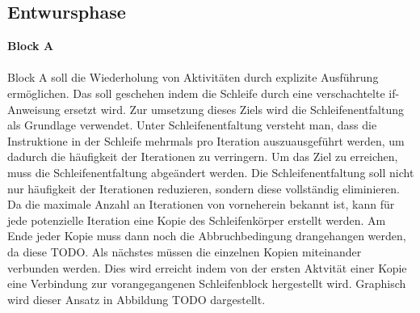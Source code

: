 \documentclass{article}
\begin{document}
    \subsection{Entwursphase}
    \textbf{Block A}\\
    \\
    Block A soll die Wiederholung von Aktivitäten durch explizite Ausführung ermöglichen.
    Das soll geschehen indem die Schleife durch eine verschachtelte if-Anweisung ersetzt wird.
    Zur umsetzung dieses Ziels wird die Schleifenentfaltung als Grundlage verwendet.
    Unter Schleifenentfaltung versteht man, dass die Instruktione in der Schleife mehrmals pro Iteration auszuausgeführt werden, um dadurch die häufigkeit der Iterationen zu verringern. \cite{9}
    Um das Ziel zu erreichen, muss die Schleifenentfaltung abgeändert werden.
    Die Schleifenentfaltung soll nicht nur häufigkeit der Iterationen reduzieren, sondern diese vollständig eliminieren.
    Da die maximale Anzahl an Iterationen von vorneherein bekannt ist, kann für jede potenzielle Iteration eine Kopie des Schleifenkörper erstellt werden. 
    Am Ende jeder Kopie muss dann noch die Abbruchbedingung drangehangen werden, da diese TODO.
    Als nächstes müssen die einzelnen Kopien miteinander verbunden werden.
    Dies wird erreicht indem von der ersten Aktvität einer Kopie eine Verbindung zur vorangegangenen Schleifenblock hergestellt wird.
    Graphisch wird dieser Ansatz in Abbildung TODO dargestellt.\\
    \\
\end{document}
